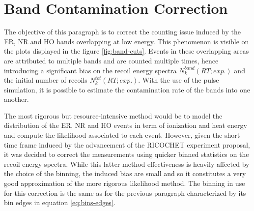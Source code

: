 

\section{Band Contamination Correction}

The objective of this paragraph is to correct the counting issue induced by the ER, NR and HO bands overlapping at low energy. This phenomenon is visible on the plots displayed in the figure \ref{fig:band-cuts}. Events in these overlapping areas are attributed to multiple bands and are counted multiple times, hence introducing a significant bias on the recoil energy spectra $N_k^{band} (RT; exp.)$ and the initial number of recoils $N_k^{tot} (RT; exp.)$. With the use of the pulse simulation, it is possible to estimate the contamination rate of the bands into one another.

The most rigorous but resource-intensive method would be to model the distribution of the ER, NR and HO events in term of ionization and heat energy and compute the likelihood associated to each event. However, given the short time frame induced by the advancement of the RICOCHET experiment proposal, it was decided to correct the measurements using quicker binned statistics on the recoil energy spectra. While this latter method effectiveness is heavily affected by the choice of the binning, the induced bias are small and so it constitutes a very good approximation of the more rigorous likelihood method. The binning in use for this correction is the same as for the previous paragraph characterized by its bin edges in equation \ref{eq:bins-edges}.

